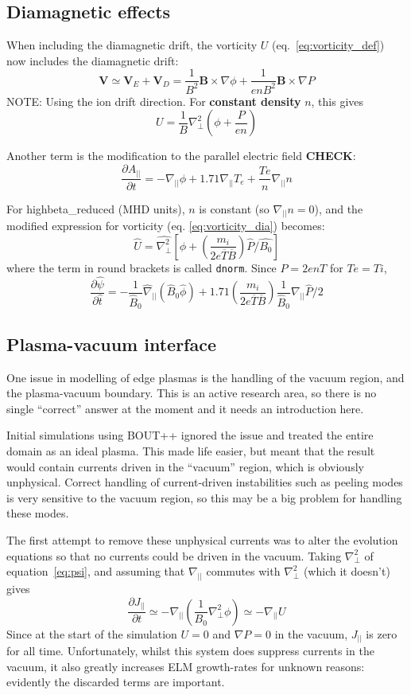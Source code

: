 \documentclass[12pt, a4paper]{article}
\newcommand{\code}[1]{\texttt{#1}}
\newcommand{\deriv}[2]{\ensuremath{\frac{\partial #1}{\partial #2}}}
\newcommand{\apar}{\ensuremath{A_{||}}}
\newcommand{\Bbar}{\overline{B}}
\newcommand{\Tbar}{\overline{T}}
\newcommand{\Jpar}{J_{||}}
\newcommand{\delp}{\nabla_\perp^2}
\begin{document}
\subsection{Diamagnetic effects}

When including the diamagnetic drift, the vorticity $U$ (eq.~\ref{eq:vorticity_def}) now includes the diamagnetic
drift:
\[
\mathbf{V}\simeq \mathbf{V}_E + \mathbf{V}_D = \frac{1}{B^2}\mathbf{B}\times\nabla\phi + \frac{1}{enB^2}\mathbf{B}\times\nabla P
\]
NOTE: Using the ion drift direction. For {\bf constant density} $n$, this gives
\begin{equation}
U = \frac{1}{B}\delp\left(\phi + \frac{P}{en}\right)
\label{eq:vorticity_dia}
\end{equation}

Another term is the modification to the parallel electric field {\bf CHECK}:
\[
\deriv{\apar}{t} = -\nabla_{||}\phi + 1.71\nabla_{||} T_e + \frac{Te}{n}\nabla_{||} n
\]

For highbeta\_reduced (MHD units), $n$ is constant (so $\nabla_{||} n = 0$), and the modified expression
for vorticity (eq. \ref{eq:vorticity_dia}) becomes:
\[
\hat{U} = \hat{\delp}\left[\hat{\phi} + \left(\frac{m_i}{2e\Tbar \Bbar}\right) \hat{P} / \hat{B_0}\right]
\]
where the term in round brackets is called \code{dnorm}. Since $P = 2enT$ for $Te = Ti$, 
\[
\deriv{\hat{\psi}}{\hat{t}} = -\frac{1}{\hat{B}_0}\hat{\nabla}_{||}\left(\hat{B}_0\hat{\phi}\right) + 1.71\left(\frac{m_i}{2e\Tbar \Bbar}\right)\frac{1}{\hat{B}_0}\nabla_{||}\hat{P}/2
\]

\subsection{Plasma-vacuum interface}

One issue in modelling of edge plasmas is the handling of the vacuum region,
and the plasma-vacuum boundary. This is an active research area, so there is no
single ``correct'' answer at the moment and it needs an introduction here.

Initial simulations using BOUT++ ignored the issue and treated the entire
domain as an ideal plasma. This made life easier, but meant that the result
would contain currents driven in the ``vacuum'' region, which is obviously unphysical.
Correct handling of current-driven instabilities such as peeling modes is
very sensitive to the vacuum region, so this may be a big problem for handling these modes.

The first attempt to remove these unphysical currents was to alter the evolution
equations so that no currents could be driven in the vacuum. Taking $\delp$ of
equation~\ref{eq:psi}, and assuming that $\nabla_{||}$ commutes with $\delp$
(which it doesn't) gives
\begin{equation}
\deriv{\Jpar}{t} \simeq -\nabla_{||}\left(\frac{1}{B_0}\delp\phi\right) \simeq -\nabla_{||} U
\label{eq:jparevolve}
\end{equation}
Since at the start of the simulation $U=0$ and $\nabla P=0$ in the vacuum, $\Jpar$ is
zero for all time. Unfortunately, whilst this system does suppress currents in the vacuum,
it also greatly increases ELM growth-rates for unknown reasons: evidently the discarded terms
are important.
\end{document}
